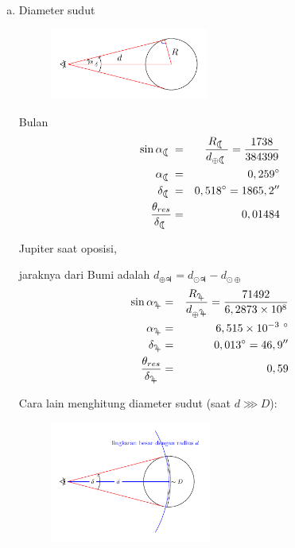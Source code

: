 \documentclass[11pt,fleqn, a4paper]{exam}
\begin{document}
\begin{questions}
\begin{enumerate}[(a)]
\item Diameter sudut
\begin{figure}[H]
\centering
\includegraphics[width=0.49\textwidth]{gambar/diametersudut_umum.pdf}
\end{figure}
\begin{minipage}[t]{0.5\textwidth}
Bulan
\begin{eqnarray*}
\sin \alpha_{\leftmoon} &=& \frac{R_{\leftmoon}}{d_{\oplus \leftmoon}} = \frac{1738}{384399}\\
\alpha_{\leftmoon} &=& 0,259\degree\\
\delta_{\leftmoon} &=& 0,518\degree = 1865,2''\\
\frac{\theta_{res}}{\delta_{\leftmoon}} &=& 0,01484
\end{eqnarray*}
\end{minipage}
\begin{minipage}[t]{0.5\textwidth}
Jupiter saat oposisi, 

jaraknya dari Bumi adalah $d_{\oplus \jupiter} = d_{\odot \jupiter} - d_{\odot \oplus}$  
\begin{eqnarray*}
\sin \alpha_{\jupiter} &=& \frac{R_{\jupiter}}{d_{\oplus \jupiter}} = \frac{71492}{6,2873 \times 10^{8}}\\
\alpha_{\jupiter} &=& 6,515 \times 10^{-3} ~^{\circ}\\
\delta_{\jupiter} &=& 0,013\degree = 46,9''\\
\frac{\theta_{res}}{\delta_{\jupiter}} &=& 0,59
\end{eqnarray*}
\end{minipage}

Cara lain menghitung diameter sudut (saat $d \ggg D$):
\begin{figure}[H]
\centering
\includegraphics[width=0.5\textwidth]{gambar/diametersudut_rad.pdf}
\end{figure}


\end{enumerate}
\end{questions}
\end{document}
